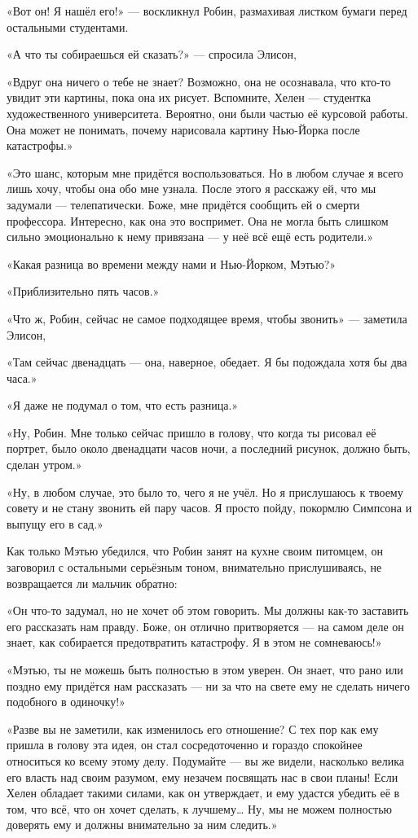 \documentclass[a5paper, 9pt,
final, openany, twoside=true]{memoir}
\begin{document}
«Вот он! Я нашёл его!» — воскликнул Робин, размахивая листком бумаги перед остальными студентами.

«А что ты собираешься ей сказать?» — спросила Элисон,

«Вдруг она ничего о тебе не знает? Возможно, она не осознавала, что кто-то увидит эти картины, пока она их рисует. Вспомните, Хелен — студентка художественного университета. Вероятно, они были частью её курсовой работы. Она может не понимать, почему нарисовала картину Нью-Йорка после катастрофы.»

«Это шанс, которым мне придётся воспользоваться. Но в любом случае я всего лишь хочу, чтобы она обо мне узнала. После этого я расскажу ей, что мы задумали — телепатически. Боже, мне придётся сообщить ей о смерти профессора. Интересно, как она это воспримет. Она не могла быть слишком сильно эмоционально к нему привязана — у неё всё ещё есть родители.»

«Какая разница во времени между нами и Нью-Йорком, Мэтью?»

«Приблизительно пять часов.»

«Что ж, Робин, сейчас не самое подходящее время, чтобы звонить» — заметила Элисон,

«Там сейчас двенадцать — она, наверное, обедает. Я бы подождала хотя бы два часа.»

«Я даже не подумал о том, что есть разница.»

«Ну, Робин. Мне только сейчас пришло в голову, что когда ты рисовал её портрет, было около двенадцати часов ночи, а последний рисунок, должно быть, сделан утром.»

«Ну, в любом случае, это было то, чего я не учёл. Но я прислушаюсь к твоему совету и не стану звонить ей пару часов. Я просто пойду, покормлю Симпсона и выпущу его в сад.»\bigskip

Как только Мэтью убедился, что Робин занят на кухне своим питомцем, он заговорил с остальными серьёзным тоном, внимательно прислушиваясь, не возвращается ли мальчик обратно:

«Он что-то задумал, но не хочет об этом говорить. Мы должны как-то заставить его рассказать нам правду. Боже, он отлично притворяется — на самом деле он знает, как собирается предотвратить катастрофу. Я в этом не сомневаюсь!»

«Мэтью, ты не можешь быть полностью в этом уверен. Он знает, что рано или поздно ему придётся нам рассказать — ни за что на свете ему не сделать ничего подобного в одиночку!»

«Разве вы не заметили, как изменилось его отношение? С тех пор как ему пришла в голову эта идея, он стал сосредоточенно и гораздо спокойнее относиться ко всему этому делу. Подумайте — вы же видели, насколько велика его власть над своим разумом, ему незачем посвящать нас в свои планы! Если Хелен обладает такими силами, как он утверждает, и ему удастся убедить её в том, что всё, что он хочет сделать, к лучшему… Ну, мы не можем полностью доверять ему и должны внимательно за ним следить.»
\end{document}
